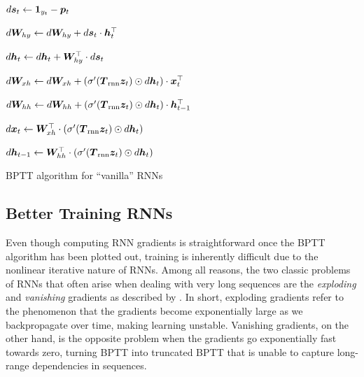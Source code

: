 \begin{algorithm}
{
$d\bm{s}_{t} \leftarrow \bm{1}_{y_t} - \bm{p}_{t}$

$d\bm{W}_{hy} \leftarrow d\bm{W}_{hy} + d\bm{s}_{t} \cdot \bm{h}_{t}^\top$

$d\bm{h}_{t} \leftarrow d\bm{h}_{t} + \bm{W}_{hy}^\top \cdot d\bm{s}_{t}$

$d\bm{W}_{xh} \leftarrow d\bm{W}_{xh} + \left(\sigma'(\mbox{\boldmath{$T$}}_{\text{rnn}} \bm{z}_{t}) \odot d\bm{h}_{t}\right) \cdot \bm{x}_{t}^\top$

$d\bm{W}_{hh} \leftarrow d\bm{W}_{hh} + \left(\sigma'(\mbox{\boldmath{$T$}}_{\text{rnn}} \bm{z}_{t}) \odot d\bm{h}_{t}\right) \cdot \bm{h}_{t-1}^\top$

$d\bm{x}_{t} \leftarrow \bm{W}_{xh}^\top \cdot \left(\sigma'(\mbox{\boldmath{$T$}}_{\text{rnn}} \bm{z}_{t}) \odot d\bm{h}_{t}\right)$

$d\bm{h}_{t-1} \leftarrow \bm{W}_{hh}^\top \cdot \left(\sigma'(\mbox{\boldmath{$T$}}_{\text{rnn}} \bm{z}_{t}) \odot d\bm{h}_{t}\right)$
}
\caption{BPTT algorithm for ``vanilla'' RNNs}
\end{algorithm}

\subsection{Better Training RNNs}


Even though computing RNN gradients is straightforward once 
the BPTT algorithm has been plotted out, training is inherently difficult due to the nonlinear
iterative nature of RNNs. Among all reasons, 
the two classic problems of RNNs that often arise when dealing with very long sequences are the {\it
exploding} and {\it vanishing} gradients as
described by . In short, exploding gradients refer to the
phenomenon that the gradients become exponentially large as we backpropagate
over time, making learning unstable. Vanishing gradients, on the
other hand, is the opposite problem when the gradients go exponentially fast
towards zero, turning BPTT into truncated BPTT that is unable to capture long-range
dependencies in sequences. 

